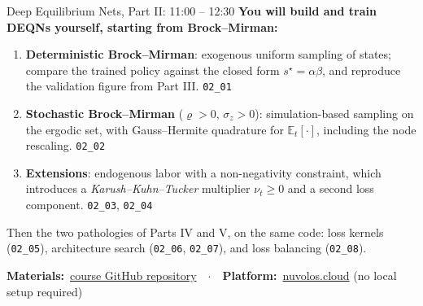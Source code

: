 \documentclass[aspectratio=169,11pt]{beamer}
\newcommand{\emphc}[1]{\textcolor{harvardcrimson}{#1}}
\newcommand{\Et}[1]{\mathbb{E}_t\!\left[#1\right]}
\begin{document}
\begin{frame}{Deep Equilibrium Nets, Part II: 11:00 -- 12:30}
\textbf{You will build and train DEQNs yourself, starting from Brock--Mirman:}

\vspace{0.4em}
\begin{enumerate}\itemsep4pt
    \item \textbf{Deterministic Brock--Mirman}: exogenous uniform sampling of states; compare the trained policy against the closed form $s^\star = \alpha\beta$, and reproduce the validation figure from Part III. \hfill{\footnotesize\texttt{02\_01}}
    \item \textbf{Stochastic Brock--Mirman} ($\varrho > 0$, $\sigma_z > 0$): \emphc{simulation-based sampling} on the ergodic set, with Gauss--Hermite quadrature for $\Et{\cdot}$, including the node rescaling. \hfill{\footnotesize\texttt{02\_02}}
    \item \textbf{Extensions}: endogenous labor with a non-negativity constraint, which introduces a \emph{Karush--Kuhn--Tucker} multiplier $\nu_t \ge 0$ and a second loss component. \hfill{\footnotesize\texttt{02\_03}, \texttt{02\_04}}
\end{enumerate}

\vspace{0.4em}
{\footnotesize Then the two pathologies of Parts IV and V, on the same code: loss kernels (\texttt{02\_05}), architecture search (\texttt{02\_06}, \texttt{02\_07}), and loss balancing (\texttt{02\_08}).}

\vspace{0.5em}
\begin{center}
{\footnotesize \textbf{Materials:}~\href{https://github.com/sischei/summer-school-AI-for-economics-and-finance-2026}{course GitHub repository}~~$\cdot$~~\textbf{Platform:}~\href{https://nuvolos.cloud}{nuvolos.cloud} (no local setup required)}
\end{center}
\end{frame}
\end{document}
